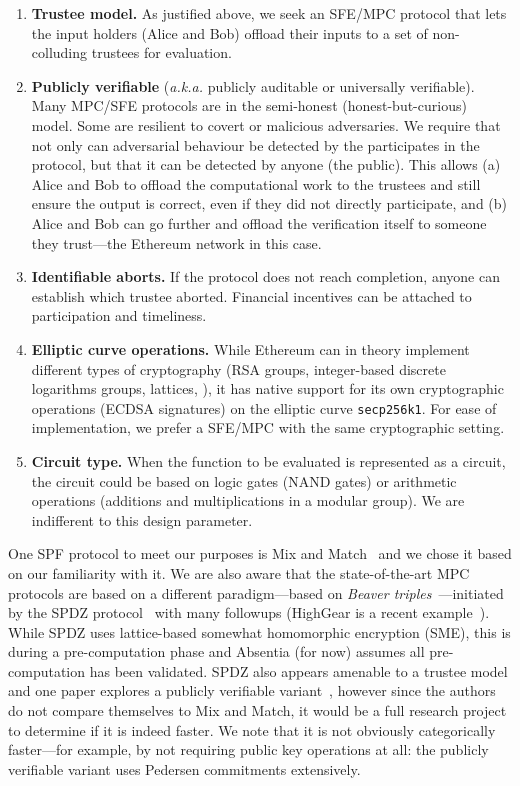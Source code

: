 \begin{enumerate}
\item \textbf{Trustee model.} As justified above, we seek an SFE/MPC protocol that lets the input holders (\eg Alice and Bob) offload their inputs to a set of non-colluding trustees for evaluation. 
\item \textbf{Publicly verifiable} (\textit{a.k.a.} publicly auditable or universally verifiable). Many MPC/SFE protocols are in the semi-honest (\ie honest-but-curious) model. Some are resilient to covert or malicious adversaries. We require that not only can adversarial behaviour  be detected by the participates in the protocol, but that it can be detected by anyone (\ie the public). This allows (a) Alice and Bob to offload the computational work to the trustees and still ensure the output is correct, even if they did not directly participate, and (b) Alice and Bob can go further and offload the verification itself to someone they trust---the Ethereum network in this case.
\item \textbf{Identifiable aborts.} If the protocol does not reach completion, anyone can establish which trustee aborted. Financial incentives can be attached to participation and timeliness.
\item \textbf{Elliptic curve operations.} While Ethereum can in theory implement different types of cryptography (RSA groups, integer-based discrete logarithms groups, lattices, \etc), it has native support for its own cryptographic operations (ECDSA signatures) on the elliptic curve \texttt{secp256k1}. For ease of implementation, we prefer a SFE/MPC with the same cryptographic setting. 
\item \textbf{Circuit type.} When the function to be evaluated is represented as a circuit, the circuit could be based on logic gates (\ie NAND gates) or arithmetic operations (\eg additions and multiplications in a modular group). We are indifferent to this design parameter.
\end{enumerate}

One SPF protocol to meet our purposes is Mix and Match~\cite{JJ00} and we chose it based on our familiarity with it. We are also aware that the state-of-the-art MPC protocols are based on a different paradigm---based on \emph{Beaver triples}~\cite{beaver1997commodity}---initiated by the SPDZ protocol~\cite{damgaard2012multiparty,damgaard2013practical} with many followups (HighGear is a recent example~\cite{keller2018overdrive}). While SPDZ uses lattice-based somewhat homomorphic encryption (SME), this is during a pre-computation phase and Absentia (for now) assumes all pre-computation has been validated. SPDZ also appears amenable to a trustee model and one paper explores a publicly verifiable variant~\cite{baum2014publicly}, however since the authors do not compare themselves to Mix and Match, it would be a full research project to determine if it is indeed faster. We note that it is not obviously categorically faster---for example, by not requiring public key operations at all: the publicly verifiable variant uses Pedersen commitments extensively.  


